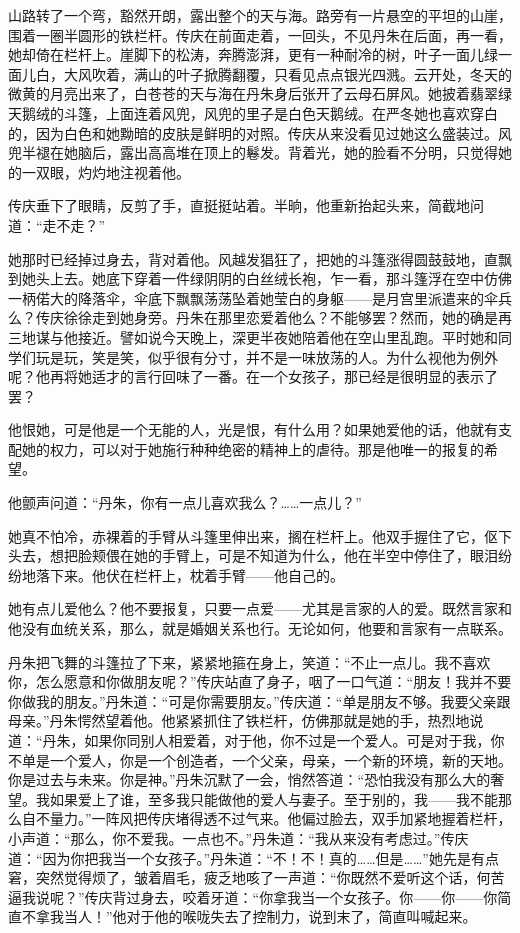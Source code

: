\documentclass[UTF8]{ctexart}
\begin{document}
山路转了一个弯，豁然开朗，露出整个的天与海。路旁有一片悬空的平坦的山崖，围着一圈半圆形的铁栏杆。传庆在前面走着，一回头，不见丹朱在后面，再一看，她却倚在栏杆上。崖脚下的松涛，奔腾澎湃，更有一种耐冷的树，叶子一面儿绿一面儿白，大风吹着，满山的叶子掀腾翻覆，只看见点点银光四溅。云开处，冬天的微黄的月亮出来了，白苍苍的天与海在丹朱身后张开了云母石屏风。她披着翡翠绿天鹅绒的斗篷，上面连着风兜，风兜的里子是白色天鹅绒。在严冬她也喜欢穿白的，因为白色和她黝暗的皮肤是鲜明的对照。传庆从来没看见过她这么盛装过。风兜半褪在她脑后，露出高高堆在顶上的鬈发。背着光，她的脸看不分明，只觉得她的一双眼，灼灼地注视着他。

传庆垂下了眼睛，反剪了手，直挺挺站着。半晌，他重新抬起头来，简截地问道：“走不走？”

她那时已经掉过身去，背对着他。风越发猖狂了，把她的斗篷涨得圆鼓鼓地，直飘到她头上去。她底下穿着一件绿阴阴的白丝绒长袍，乍一看，那斗篷浮在空中仿佛一柄偌大的降落伞，伞底下飘飘荡荡坠着她莹白的身躯——是月宫里派遣来的伞兵么？传庆徐徐走到她身旁。丹朱在那里恋爱着他么？不能够罢？然而，她的确是再三地谋与他接近。譬如说今天晚上，深更半夜她陪着他在空山里乱跑。平时她和同学们玩是玩，笑是笑，似乎很有分寸，并不是一味放荡的人。为什么视他为例外呢？他再将她适才的言行回味了一番。在一个女孩子，那已经是很明显的表示了罢？

他恨她，可是他是一个无能的人，光是恨，有什么用？如果她爱他的话，他就有支配她的权力，可以对于她施行种种绝密的精神上的虐待。那是他唯一的报复的希望。

他颤声问道：“丹朱，你有一点儿喜欢我么？……一点儿？”

她真不怕冷，赤裸着的手臂从斗篷里伸出来，搁在栏杆上。他双手握住了它，伛下头去，想把脸颊偎在她的手臂上，可是不知道为什么，他在半空中停住了，眼泪纷纷地落下来。他伏在栏杆上，枕着手臂——他自己的。

她有点儿爱他么？他不要报复，只要一点爱——尤其是言家的人的爱。既然言家和他没有血统关系，那么，就是婚姻关系也行。无论如何，他要和言家有一点联系。

丹朱把飞舞的斗篷拉了下来，紧紧地箍在身上，笑道：“不止一点儿。我不喜欢你，怎么愿意和你做朋友呢？”传庆站直了身子，咽了一口气道：“朋友！我并不要你做我的朋友。”丹朱道：“可是你需要朋友。”传庆道：“单是朋友不够。我要父亲跟母亲。”丹朱愕然望着他。他紧紧抓住了铁栏杆，仿佛那就是她的手，热烈地说道：“丹朱，如果你同别人相爱着，对于他，你不过是一个爱人。可是对于我，你不单是一个爱人，你是一个创造者，一个父亲，母亲，一个新的环境，新的天地。你是过去与未来。你是神。”丹朱沉默了一会，悄然答道：“恐怕我没有那么大的奢望。我如果爱上了谁，至多我只能做他的爱人与妻子。至于别的，我——我不能那么自不量力。”一阵风把传庆堵得透不过气来。他偏过脸去，双手加紧地握着栏杆，小声道：“那么，你不爱我。一点也不。”丹朱道：“我从来没有考虑过。”传庆道：“因为你把我当一个女孩子。”丹朱道：“不！不！真的……但是……”她先是有点窘，突然觉得烦了，皱着眉毛，疲乏地咳了一声道：“你既然不爱听这个话，何苦逼我说呢？”传庆背过身去，咬着牙道：“你拿我当一个女孩子。你——你——你简直不拿我当人！”他对于他的喉咙失去了控制力，说到末了，简直叫喊起来。
\end{document}
